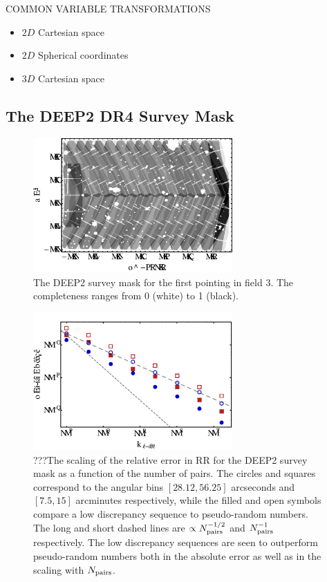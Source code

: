 \documentclass[usenatbib]{mn2e}
\begin{document}
COMMON VARIABLE TRANSFORMATIONS
\begin{itemize}
  \item $2D$ Cartesian space
  \item $2D$ Spherical coordinates
  \item $3D$ Cartesian space
\end{itemize}

\subsection{The DEEP2 DR4 Survey Mask}

\begin{figure}
\includegraphics[width=3in]{plots/deep2mask}
\caption{The DEEP2 survey mask for the first pointing in field 3. The
completeness ranges from 0 (white) to 1 (black). }
\label{fig:deep2mask}
\end{figure}

\begin{figure}
\includegraphics[width=3in]{plots/deep2rrcomp1}
\caption{???The scaling of the relative error in RR for the DEEP2 survey mask as
a function of the number of pairs. The circles and squares correspond to the
angular bins $[28.12,56.25]$ arcseconds and $[7.5,15]$ arcminutes respectively,
while the filled and open symbols compare a low discrepancy
sequence to pseudo-random numbers. The long and short dashed lines are
$\propto N_{\rm pairs}^{-1/2}$ and $N_{\rm pairs}^{-1}$ respectively. The low
discrepancy sequences are seen to outperform pseudo-random numbers both in the
absolute error as well as in the scaling with $N_{\rm pairs}$.}
\label{fig:deep2comp1}
\end{figure}
\end{document}
